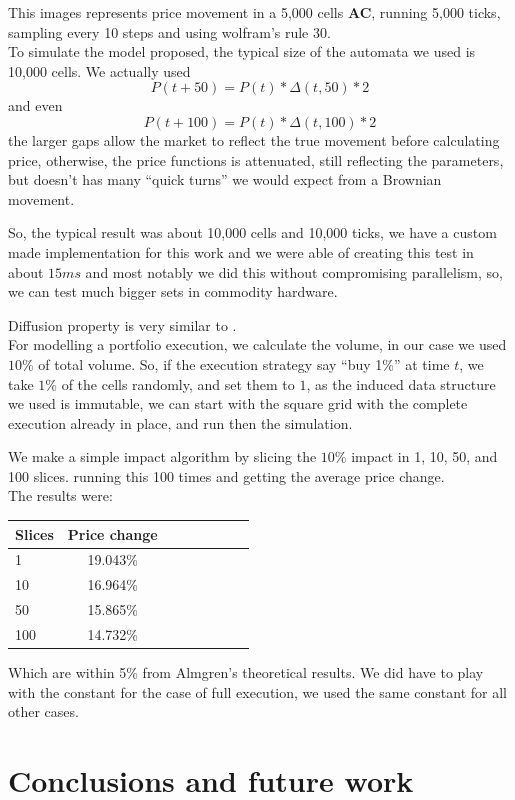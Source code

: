 \documentclass[twoside]{article}
\begin{document}
\begin{multicols}{2}
This images represents price movement in a 5,000 cells {\bf AC}, running 5,000 ticks, sampling every 10 steps and using wolfram's rule 30. \\

To simulate the model proposed, the typical size of the automata we used is 10,000 cells.
We actually used $$P(t+50)=P(t)*\Delta(t,50)*2$$ and even $$P(t+100)=P(t)*\Delta(t,100)*2$$
the larger gaps allow the market to reflect the true movement before calculating price, otherwise, the price functions is attenuated, still reflecting the parameters, but doesn't has many ``quick turns'' we would expect from a Brownian movement.

So, the typical result was about 10,000 cells and 10,000 ticks, we have a custom made implementation for this work and we were able of creating this test in about $15ms$ and most notably we did this without compromising parallelism, so, we can test much bigger sets in commodity hardware.

Diffusion property is very similar to .\\

For modelling a portfolio execution, we calculate the volume, in our case we used $10\%$ of total volume. So, if the execution strategy say ``buy 1\%'' at time $t$, we take $1\%$ of the cells randomly, and set them to $1$, as the induced data structure we used is immutable, we can start with the square grid with the complete execution already in place, and run then the simulation.
 
We make a simple impact algorithm by slicing the $10\%$ impact in 1, 10, 50, and 100 slices. running this 100 times and getting the average price change.\\

The results were:

\begin{tabular}{l*{6}{c}r}
Slices & Price change\\
\hline
1   & 19.043\% \\
10  & 16.964\% \\
50  & 15.865\% \\
100 & 14.732\% \\
\end{tabular}

Which are within 5\% from Almgren's \cite{Almgren2005} theoretical results.
We did have to play with the constant for the case of full execution, we used the same constant for all other cases.


\section{Conclusions and future work}


\end{multicols}
\end{document}
